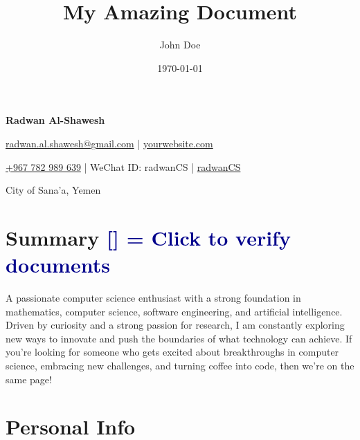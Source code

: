 \documentclass[a4paper,11pt]{article}
\title{My Amazing Document}
\author{John Doe}
\date{\today}  %
\newcommand{\socialicon}[1]{\raisebox{-0.05em}{\resizebox{!}{1em}{#1}}}
\newcommand{\headerfontiii}{\fontfamily{ppl}\selectfont} %
\begin{document}
	\headerfontiii
	
	\begin{center}
		{\Huge\textbf{Radwan Al-Shawesh}}
	\end{center}
	\vspace{-6mm}
	
	\begin{center}
		\small{
			\href{mailto:radwan.al.shawesh@gmail.com}{radwan.al.shawesh@gmail.com} | 
			\href{https://www.yourwebsite.com/}{yourwebsite.com}
		}
	\end{center}
	\vspace{-6mm}
	
	\begin{center}
		\small{
			\socialicon{\faWhatsappSquare} \href{https://wa.me/967782989639}{+967 782 989 639} |
			\socialicon{\faWeixin} WeChat ID: radwanCS |
			\socialicon{\faGithub} \href{https://github.com/radwanCS}{radwanCS}
		}
	\end{center}
	\vspace{-6mm}
	
	\begin{center}
		\small{City of Sana'a, Yemen}
	\end{center}
	\vspace{-4mm}

	\section{\textbf{Summary} \hspace*{\fill} 
    \textcolor{darkblue}{\scriptsize [\href{https://1drv.ms/f/c/0b66680558f854cf/EmMcNN-2rp5JkBqREvrLziABZw0qcxK9gYBRxxkRwz2g9A?e=Dd3Xgb}{\texorpdfstring{\faGlobe}{Clickable Link}}] = Click to verify documents}
	}
	\vspace{1mm}
	\small{
		A passionate computer science enthusiast with a strong foundation in mathematics, computer science, software engineering, and 
		artificial intelligence. Driven by curiosity and a strong passion for research, I am constantly exploring new ways to innovate 
		and push the boundaries of what technology can achieve. If you're looking for someone who gets excited about breakthroughs in computer science, 
		embracing new challenges, and turning coffee into code, then we’re on the same page!
	}
	\vspace{-2mm}
	
	\section{\textbf{Personal Info}}
	\vspace{-2mm}
\end{document}
